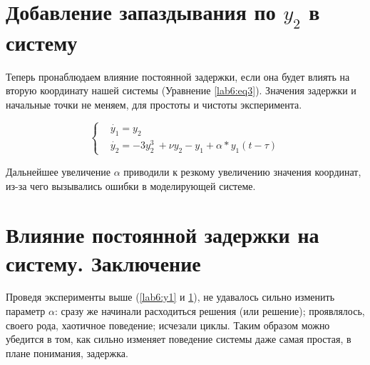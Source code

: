 \clearpage
\section{Добавление запаздывания по $y_2$ в систему}\label{lab6:y2}

Теперь пронаблюдаем влияние постоянной задержки, если она будет влиять на
вторую координату нашей системы (Уравнение \ref{lab6:eq3}). Значения задержки
и начальные точки не меняем, для простоты и чистоты эксперимента.

\begin{equation}\label{lab6:eq1}
    \begin{cases}
        &\dot{y_1} = y_2\\
        &\dot{y_2} = -3y_2^3\ + \nu y_2 - y_1  + \alpha * y_1(t-\tau)
    \end{cases}
\end{equation}

\clearpage
{}
Дальнейшее увеличение $\alpha$ приводили к резкому увеличению значения координат,
из-за чего вызывались ошибки в моделирующей системе.


\clearpage
\section{Влияние постоянной задержки на систему. Заключение}

Проведя эксперименты выше (\ref{lab6:y1} и \ref{lab6:y2}),
не удавалось сильно изменить параметр $\alpha$: сразу же начинали расходиться
решения (или решение); проявлялось, своего рода, хаотичное поведение; исчезали циклы.
Таким образом можно убедится в том, как сильно изменяет поведение системы
даже самая простая, в плане понимания, задержка.
